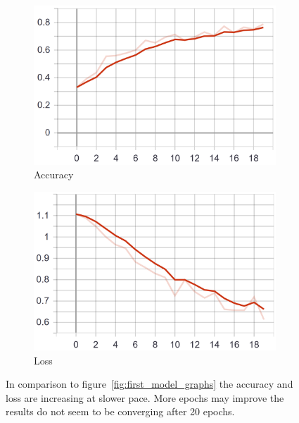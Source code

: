 \begin{figure} \label{fig:first_model_data_augmentation_graphs}
    \centering
    \begin{subfigure}[b]{0.4\textwidth}
        \includegraphics[width=\textwidth]{images/first_model_data_augmentation_acc.png}
        \caption{Accuracy}
        \label{fig:first_model_data_augmentation_acc}
    \end{subfigure}
    \begin{subfigure}[b]{0.4\textwidth}
        \includegraphics[width=\textwidth]{images/first_model_data_augmentation_loss.png}
        \caption{Loss}
        \label{fig:first_model_data_augmentation_loss}
    \end{subfigure}
    \caption{In comparison to figure~\ref{fig:first_model_graphs} the accuracy and loss are increasing at slower pace. More epochs may improve the results do not seem to be converging after 20 epochs.}
\end{figure}

